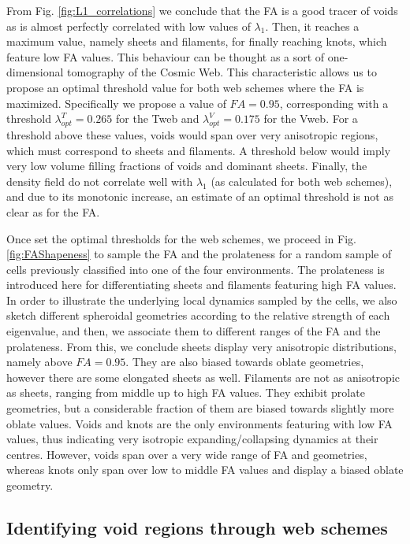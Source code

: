 \documentclass[a4,useAMS,usenatbib,usegraphicx]{latex/mn2e}
\begin{document}
From Fig. \ref{fig:L1_correlations} we conclude that the FA is a good
tracer of voids as is almost perfectly correlated with low values of 
$\lambda_1$. Then, it reaches a maximum value, namely sheets and filaments, 
for finally reaching knots, which feature low FA values. This behaviour can 
be thought as a sort of one-dimensional tomography of the Cosmic Web. This
characteristic allows us to propose an optimal threshold value for both 
web schemes where the FA is maximized. Specifically we propose a value of 
$FA=0.95$, corresponding with a threshold $\lambda_{opt}^T = 0.265$ for
the Tweb and $\lambda_{opt}^V = 0.175$ for the Vweb.  For a threshold 
above these values, voids would span over very anisotropic regions, which 
must correspond to sheets and filaments. A threshold below would imply 
very low volume filling fractions of voids and dominant sheets. Finally, 
the density field do not correlate well with $\lambda_1$ (as calculated 
for both web schemes), and due to its monotonic increase, an estimate of 
an optimal threshold is not as clear as for the FA.


Once set the optimal thresholds for the web schemes, we proceed in Fig. 
\ref{fig:FAShapeness} to sample the FA and the prolateness for a random 
sample of cells previously classified into one of the four environments. 
The prolateness is introduced here for differentiating sheets and filaments
featuring high FA values. In order to illustrate the underlying local 
dynamics sampled by the cells, we also sketch different spheroidal 
geometries according to the relative strength of each eigenvalue, and 
then, we associate them to different ranges of the FA and the prolateness. 
From this, we conclude sheets display very anisotropic distributions, 
namely above $FA=0.95$. They are also biased towards oblate geometries, 
however there are some elongated sheets as well. Filaments are not as 
anisotropic as sheets, ranging from middle up to high FA values. They 
exhibit prolate geometries, but a considerable fraction of them are biased 
towards slightly more oblate values. Voids and knots are the only 
environments featuring with low FA values, thus indicating very isotropic 
expanding/collapsing dynamics at their centres. However, voids span over 
a very wide range of FA and geometries, whereas knots only span over low 
to middle FA values and display a biased oblate geometry.


\subsection{Identifying void regions through web schemes}
\label{subsec:identification}
\end{document}
